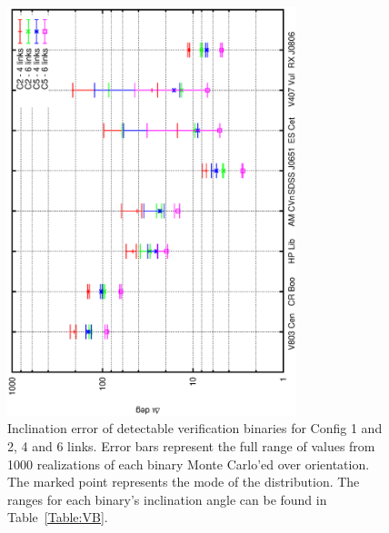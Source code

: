 \documentclass{iopart}
\begin{document}
\begin{figure}[H]
\begin{center}
   \includegraphics[angle=270,width=0.75\textwidth]{FigGBTyson/inc.eps} %
   \caption{Inclination error of detectable verification binaries for Config 1 and 2, 4 and 6 links.  Error bars represent the full range of values from 1000 realizations of each binary Monte Carlo'ed over orientation.  The marked point represents the mode of the distribution.  The ranges for each binary's inclination angle can be found in Table~\ref{Table:VB}.}
   \label{Figure:VBinc}
   \end{center}
\end{figure}
\end{document}
